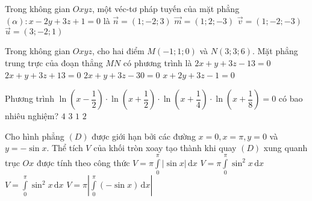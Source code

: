 \begin{ex}%
	Trong không gian $Oxyz$, một véc-tơ pháp tuyến của mặt phẳng $(\alpha)\colon x-2y+3z+1=0$ là
	\choice
	{\True $\overrightarrow{n}=(1;-2;3)$}
	{$\overrightarrow{m}=(1;2;-3)$}
	{$\overrightarrow{v}=(1;-2;-3)$}
	{$\overrightarrow{u}=(3;-2;1)$}
\end{ex}
\begin{ex}%
	Trong không gian $Oxyz$, cho hai điểm $M(-1;1;0)$ và $N(3;3;6)$. Mặt phẳng trung trực của đoạn thẳng $MN$ có phương trình là
	\choice
	{\True $2x+y+3z-13=0$}
	{$2x+y+3z+13=0$}
	{$2x+y+3z-30=0$}
	{$x+2y+3z-1=0$}
\end{ex}
\begin{ex}%
	Phương trình $\ln \left(x-\dfrac{1}{2}\right)\cdot \ln \left(x+\dfrac{1}{2}\right)\cdot \ln \left(x+\dfrac{1}{4}\right)\cdot \ln \left(x+\dfrac{1}{8}\right)=0$ có bao nhiêu nghiệm?
	\choice
	{$4$}
	{\True $3$}
	{$1$}
	{$2$}
\end{ex}
\begin{ex}%
	Cho hình phẳng $(D)$ được giới hạn bởi các đường $x=0,x=\pi,y=0$ và $y=-\sin x$. Thể tích $V$ của khối tròn xoay tạo thành khi quay $(D)$ xung quanh trục $Ox$ được tính theo công thức
	\choice
	{$V=\pi \displaystyle\int\limits_0^{\pi} \left|\sin x\right|\mathrm{\,d}x$}
	{\True $V=\pi \displaystyle\int\limits_0^{\pi} \sin^2x\mathrm{\,d}x$}
	{$V=\displaystyle\int\limits_0^{\pi} \sin^2x\mathrm{\,d}x$}
	{$V=\pi \left|\displaystyle\int\limits_0^{\pi} \left(-\sin x\right)\mathrm{\,d}x\right|$}
\end{ex}
